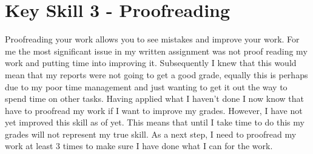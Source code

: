 \documentclass{scrartcl}
\begin{document}
\section{Key Skill 3 - Proofreading}

Proofreading your work allows you to see mistakes and improve your work. For me the most significant issue in my written assignment was not proof reading my work and putting time into improving it. Subsequently I knew that this would mean that my reports were not going to get a good grade, equally this is perhaps due to my poor time management and just wanting to get it out the way to spend time on other tasks. Having applied what I haven't done I now know that have to proofread my work if I want to improve my grades. However, I have not yet improved this skill as of yet. This means that until I take time to do this my grades will not represent my true skill. As a next step, I need to proofread my work at least 3 times to make sure I have done what I can for the work.
\end{document}
